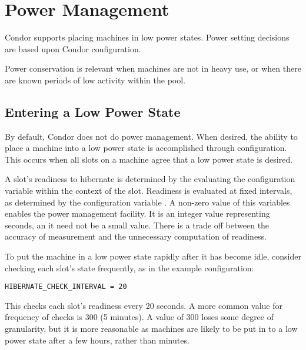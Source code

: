\section{\label{sec:power-man}Power Management}

Condor supports placing machines in low power states.
Power setting decisions are based upon  
Condor configuration.

Power conservation is relevant when machines are not in heavy use,
or when there are known periods of low activity within the pool.

\subsection{Entering a Low Power State}

By default, Condor does not do power management.
When desired, the ability to place a machine into a low
power state is accomplished through configuration.
This occurs when all slots on a machine agree that a low power state
is desired.

A slot's readiness to hibernate is determined by the 
evaluating the  configuration variable within 
the context of the slot.
Readiness is evaluated at fixed intervals, 
as determined by the configuration variable
.
A non-zero value of this variables enables the power management facility.
It is an integer value representing seconds,
an it need not be a small value.
There is a trade off between the accuracy of measurement and 
the unnecessary computation of readiness.  

To put the machine in a low power state rapidly
after it has become idle, consider checking each slot's state frequently,
as in the example configuration:

\begin{verbatim}
HIBERNATE_CHECK_INTERVAL = 20
\end{verbatim}

This checks each slot's readiness every 20 seconds.
A more common value for frequency of checks is 300 (5 minutes).
A value of 300 loses some degree of granularity,
but it is more reasonable as machines are likely to be put 
in to a low power state after a few hours, rather than minutes.
 
